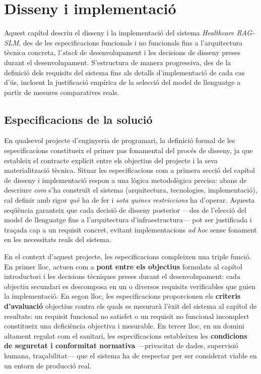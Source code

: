 \documentclass[CAT]{TFUOC}%
\begin{document}
\chapter{Disseny i implementació}

Aquest capítol descriu el disseny i la implementació del sistema \textit{Healthcare RAG-SLM}, des de les especificacions funcionals i no funcionals fins a l'arquitectura tècnica concreta, l'\textit{stack} de desenvolupament i les decisions de disseny preses durant el desenvolupament. S'estructura de manera progressiva, des de la definició dels requisits del sistema fins als detalls d'implementació de cada cas d'ús, incloent la justificació empírica de la selecció del model de llenguatge a partir de mesures comparatives reals.

\section{Especificacions de la solució}

En qualsevol projecte d'enginyeria de programari, la definició formal de les especificacions constitueix el primer pas fonamental del procés de disseny, ja que estableix el contracte explícit entre els objectius del projecte i la seva materialització tècnica. Situar les especificacions com a primera secció del capítol de disseny i implementació respon a una lògica metodològica precisa: abans de descriure \textit{com} s'ha construït el sistema (arquitectura, tecnologies, implementació), cal definir amb rigor \textit{què} ha de fer i \textit{sota quines restriccions} ha d'operar. Aquesta seqüència garanteix que cada decisió de disseny posterior ---des de l'elecció del model de llenguatge fins a l'arquitectura d'infraestructura--- pot ser justificada i traçada cap a un requisit concret, evitant implementacions \textit{ad hoc} sense fonament en les necessitats reals del sistema.

En el context d'aquest projecte, les especificacions compleixen una triple funció. En primer lloc, actuen com a \textbf{pont entre els objectius} formulats al capítol introductori i les decisions tècniques preses durant el desenvolupament: cada objectiu secundari es descomposa en un o diversos requisits verificables que guien la implementació. En segon lloc, les especificacions proporcionen els \textbf{criteris d'avaluació} objectius contra els quals es mesurarà l'èxit del sistema al capítol de resultats: un requisit funcional no satisfet o un requisit no funcional incomplert constitueix una deficiència objectiva i mesurable. En tercer lloc, en un domini altament regulat com el sanitari, les especificacions estableixen les \textbf{condicions de seguretat i conformitat normativa} ---privacitat de dades, supervisió humana, traçabilitat--- que el sistema ha de respectar per ser considerat viable en un entorn de producció real.
\end{document}
